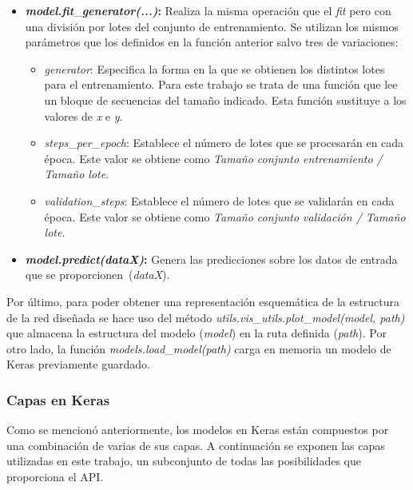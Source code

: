 \begin{itemize}
\begin{itemize}
    \end{itemize}
    \item \textbf{\textit{model.fit}}\_\textbf{\textit{generator(...)}:} Realiza la misma operación que el \textit{fit} pero con una división por lotes del conjunto de entrenamiento. Se utilizan los mismos parámetros que los definidos en la función anterior salvo tres de variaciones:
    \begin{itemize}
        \item \textit{generator}: Especifica la forma en la que se obtienen los distintos lotes para el entrenamiento. Para este trabajo se trata de una función que lee un bloque de secuencias del tamaño indicado. Esta función sustituye a los valores de \textit{x} e \textit{y}.
        \item \textit{steps}\_\textit{per}\_\textit{epoch}: Establece el número de lotes que se procesarán en cada época. Este valor se obtiene como \textit{Tamaño conjunto entrenamiento / Tamaño lote}.
        \item \textit{validation}\_\textit{steps}: Establece el número de lotes que se validarán en cada época. Este valor se obtiene como \textit{Tamaño conjunto validación / Tamaño lote}.
    \end{itemize}
    \item \textbf{\textit{model.predict(dataX)}:} Genera las predicciones sobre los datos de entrada que se proporcionen~(\textit{dataX}).
    
\end{itemize}
Por último, para poder obtener una representación esquemática de la estructura de la red diseñada se hace uso del método \textit{utils.vis}\_\textit{utils.plot}\_\textit{model(model, path)} que almacena la estructura del modelo (\textit{model}) en la ruta definida (\textit{path}). Por otro lado, la función \textit{models.load}\_\textit{model(path)} carga en memoria un modelo de Keras previamente guardado.

\subsubsection{Capas en Keras}
Como se mencionó anteriormente, los modelos en Keras están compuestos por una combinación de varias de sus capas. A continuación se exponen las capas utilizadas en este trabajo, un subconjunto de todas las posibilidades que proporciona el API.

